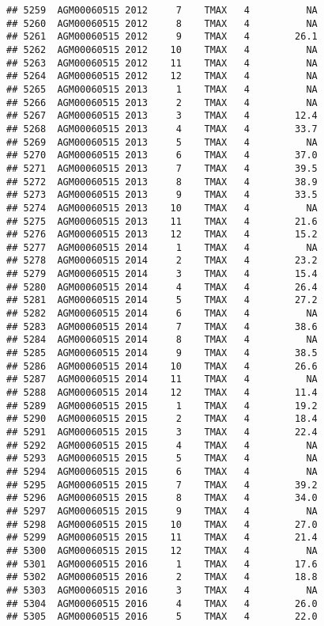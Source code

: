 \documentclass{article}\usepackage[]{graphicx}\usepackage[]{color}
\makeatletter
\newenvironment{kframe}{%
 \def\at@end@of@kframe{}%
 \ifinner\ifhmode%
  \def\at@end@of@kframe{\end{minipage}}%
  \begin{minipage}{\columnwidth}%
 \fi\fi%
 \def\FrameCommand##1{\hskip\@totalleftmargin \hskip-\fboxsep
 \colorbox{shadecolor}{##1}\hskip-\fboxsep
     \hskip-\linewidth \hskip-\@totalleftmargin \hskip\columnwidth}%
 \MakeFramed {\advance\hsize-\width
   \@totalleftmargin\z@ \linewidth\hsize
   \@setminipage}}%
 {\par\unskip\endMakeFramed%
 \at@end@of@kframe}
\newenvironment{knitrout}{}{} %
\makeatother
\begin{document}
\begin{knitrout}
\begin{kframe}
\begin{verbatim}
## 5259  AGM00060515 2012     7    TMAX   4          NA
## 5260  AGM00060515 2012     8    TMAX   4          NA
## 5261  AGM00060515 2012     9    TMAX   4        26.1
## 5262  AGM00060515 2012    10    TMAX   4          NA
## 5263  AGM00060515 2012    11    TMAX   4          NA
## 5264  AGM00060515 2012    12    TMAX   4          NA
## 5265  AGM00060515 2013     1    TMAX   4          NA
## 5266  AGM00060515 2013     2    TMAX   4          NA
## 5267  AGM00060515 2013     3    TMAX   4        12.4
## 5268  AGM00060515 2013     4    TMAX   4        33.7
## 5269  AGM00060515 2013     5    TMAX   4          NA
## 5270  AGM00060515 2013     6    TMAX   4        37.0
## 5271  AGM00060515 2013     7    TMAX   4        39.5
## 5272  AGM00060515 2013     8    TMAX   4        38.9
## 5273  AGM00060515 2013     9    TMAX   4        33.5
## 5274  AGM00060515 2013    10    TMAX   4          NA
## 5275  AGM00060515 2013    11    TMAX   4        21.6
## 5276  AGM00060515 2013    12    TMAX   4        15.2
## 5277  AGM00060515 2014     1    TMAX   4          NA
## 5278  AGM00060515 2014     2    TMAX   4        23.2
## 5279  AGM00060515 2014     3    TMAX   4        15.4
## 5280  AGM00060515 2014     4    TMAX   4        26.4
## 5281  AGM00060515 2014     5    TMAX   4        27.2
## 5282  AGM00060515 2014     6    TMAX   4          NA
## 5283  AGM00060515 2014     7    TMAX   4        38.6
## 5284  AGM00060515 2014     8    TMAX   4          NA
## 5285  AGM00060515 2014     9    TMAX   4        38.5
## 5286  AGM00060515 2014    10    TMAX   4        26.6
## 5287  AGM00060515 2014    11    TMAX   4          NA
## 5288  AGM00060515 2014    12    TMAX   4        11.4
## 5289  AGM00060515 2015     1    TMAX   4        19.2
## 5290  AGM00060515 2015     2    TMAX   4        18.4
## 5291  AGM00060515 2015     3    TMAX   4        22.4
## 5292  AGM00060515 2015     4    TMAX   4          NA
## 5293  AGM00060515 2015     5    TMAX   4          NA
## 5294  AGM00060515 2015     6    TMAX   4          NA
## 5295  AGM00060515 2015     7    TMAX   4        39.2
## 5296  AGM00060515 2015     8    TMAX   4        34.0
## 5297  AGM00060515 2015     9    TMAX   4          NA
## 5298  AGM00060515 2015    10    TMAX   4        27.0
## 5299  AGM00060515 2015    11    TMAX   4        21.4
## 5300  AGM00060515 2015    12    TMAX   4          NA
## 5301  AGM00060515 2016     1    TMAX   4        17.6
## 5302  AGM00060515 2016     2    TMAX   4        18.8
## 5303  AGM00060515 2016     3    TMAX   4          NA
## 5304  AGM00060515 2016     4    TMAX   4        26.0
## 5305  AGM00060515 2016     5    TMAX   4        22.0

\end{verbatim}
\end{kframe}
\end{knitrout}
\end{document}
